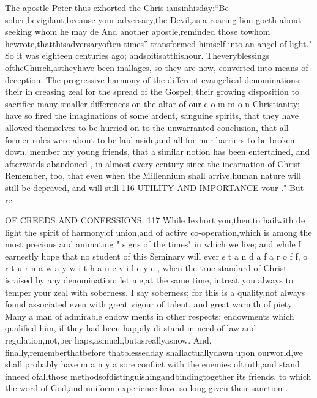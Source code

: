 \documentclass[
]{book}
\begin{document}
The apostle Peter thus exhorted the Chris iansinhisday:``Be sober,bevigilant,because your adversary,the Devil,as a roaring lion goeth about seeking whom he may de
And another apostle,reminded those towhom hewrote,thatthisadversaryoften times'' transformed himself into an angel of light." So it was eighteen centuries ago; andsoitisatthishour. Theveryblessings oftheChurch,astheyhave been inallages, so they are now, converted into means of deception. The progressive harmony of the different evangelical denominations; their in creasing zeal for the spread of the Gospel; their growing disposition to sacrifice many smaller differences on the altar of our c o m m o n
Christianity; have so fired the imaginations of some ardent, sanguine spirits, that they have allowed themselves to be hurried on to
the unwarranted conclusion, that all former
rules were about to be laid aside,and all for mer barriers to be broken down.
member my young friends, that a similar notion has been entertained, and afterwards
abandoned , in almost every century since the incarnation of Christ. Remember, too, that
even when the Millennium shall arrive,human nature will still be depraved, and will still
116 UTILITY AND IMPORTANCE
vour
."
But re

OF CREEDS AND CONFESSIONS. 117
While Iexhort you,then,to hailwith de
light the spirit of harmony,of union,and of
active co-operation,which is among the most precious and animating " signs of the times" in which we live; and while I earnestly hope
that no student of this Seminary will ever s t a n d a f a r o f f, o r t u r n a w a y w i t h a n e v i l e y e ,
when the true standard of Christ israised by any denomination; let me,at the same time,
intreat you always to temper your zeal with soberness. I say soberness; for this is a
quality,not always found associated even with
great vigour of talent, and great warmth of piety. Many a man of admirable endow
ments in other respects; endowments which qualified him, if they had been happily di
stand in need of law and regulation,not,per haps,asmuch,butasreallyasnow. And, finally,rememberthatbefore thatblessedday
shallactuallydawn upon ourworld,we shall probably have m a n y a sore conflict with the enemies oftruth,and stand inneed ofallthose methodsofdistinguishingandbindingtogether its friends, to which the word of God,and
uniform experience have so long given their sanction .
\end{document}

